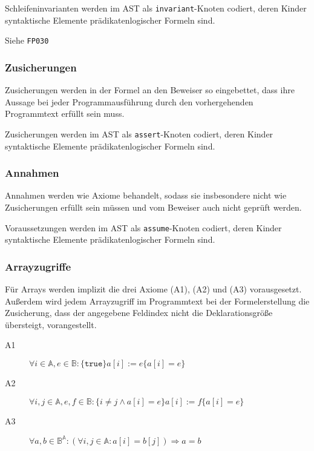 Schleifeninvarianten werden im AST als \texttt{invariant}-Knoten
codiert, deren Kinder syntaktische Elemente prädikatenlogischer
Formeln sind.%

Siehe \texttt{FP030}%

\subsubsection{Zusicherungen}%

Zusicherungen werden in der Formel an den Beweiser so eingebettet,
dass ihre Aussage bei jeder Programmausführung durch den
vorhergehenden Programmtext erfüllt sein muss.%

Zusicherungen werden im AST als \texttt{assert}-Knoten codiert, deren
Kinder syntaktische Elemente prädikatenlogischer Formeln sind.%

\subsubsection{Annahmen}%

Annahmen werden wie Axiome behandelt, sodass sie insbesondere nicht
wie Zusicherungen erfüllt sein müssen und vom Beweiser auch nicht
geprüft werden.%

Voraussetzungen werden im AST als \texttt{assume}-Knoten codiert,
deren Kinder syntaktische Elemente prädikatenlogischer Formeln sind.%

\subsubsection{Arrayzugriffe}%

Für Arrays werden implizit die drei Axiome (A1), (A2) und (A3)
vorausgesetzt. Außerdem wird jedem Arrayzugriff im Programmtext bei
der Formelerstellung die Zusicherung, dass der angegebene Feldindex
nicht die Deklarationsgröße übersteigt, vorangestellt.%

\begin{description}%
    \item[A1] \begin{math}\forall i \in \mathbb{A}, e \in \mathbb{B} : \{\texttt{true}\} a[i] := e \{a[i] = e\}\end{math}%
    \item[A2] \begin{math}\forall i, j \in \mathbb{A}, e, f \in \mathbb{B} : \{i \neq j \wedge a[i] = e\} a[i] := f \{a[i] = e\}\end{math}%
    \item[A3] \begin{math}\forall a, b \in \mathbb{B}^\mathbb{A} : (\forall i, j \in \mathbb{A} : a[i] = b[j]) \Rightarrow a = b\end{math}%
\end{description}%

